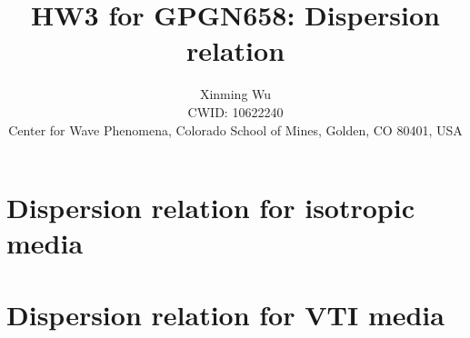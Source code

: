 \documentclass[referee]{../../../texCls/mayWithTeaser}
\begin{document}
\title{HW3 for GPGN658: Dispersion relation}
\author[X.~Wu]
{Xinming Wu\\
CWID: 10622240\\
Center for Wave Phenomena, Colorado School of Mines, Golden, CO 80401, USA}
\maketitle
\section{Dispersion relation for isotropic media}
\section{Dispersion relation for VTI media}
\end{document}

